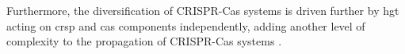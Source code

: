 Furthermore, the diversification of CRISPR-Cas systems is driven further by \ac{hgt} acting on \ac{crsp} and \ac{cas} components independently, adding another level of complexity to the propagation of CRISPR-Cas systems \citep{crispgen}.
